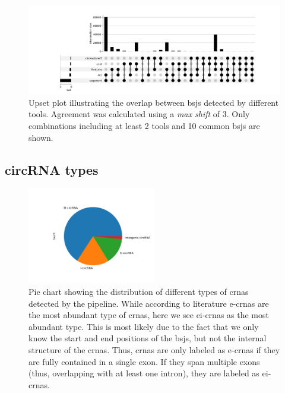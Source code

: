 \begin{figure}[H]
    \centering

    \includegraphics[width=\textwidth]{chapters/4_results_and_discussion/figures/detection/upset/shift_3.png}
    \caption{Upset plot illustrating the overlap between \glspl{bsj} detected
        by
        different tools.
        Agreement was calculated using a \textit{max shift} of 3.
        Only combinations including at least 2 tools and 10 common \glspl{bsj} are
        shown.
    }
    \label{fig:detection_upset_3}
\end{figure}

\subsection{circRNA types}

\begin{figure}[H]
    \centering

    \includegraphics[width=0.5\textwidth]{chapters/4_results_and_discussion/figures/detection/types.png}
    \caption{Pie chart showing the distribution of different types of
        \glspl{crna} detected by the pipeline.
        While according to literature \glspl{e-crna} are the most abundant type of
        \glspl{crna}, here we see \glspl{ei-crna} as the most abundant type.
        This is most likely due to the fact that we only know the start and end
        positions of the \glspl{bsj}, but not the internal structure of the
        \glspl{crna}.
        Thus, \glspl{crna} are only labeled as \glspl{e-crna} if they are fully
        contained in a single exon.
        If they span multiple exons (thus, overlapping with at least one intron), they
        are labeled as \glspl{ei-crna}.
    }
    \label{fig:circrna_types}
\end{figure}

